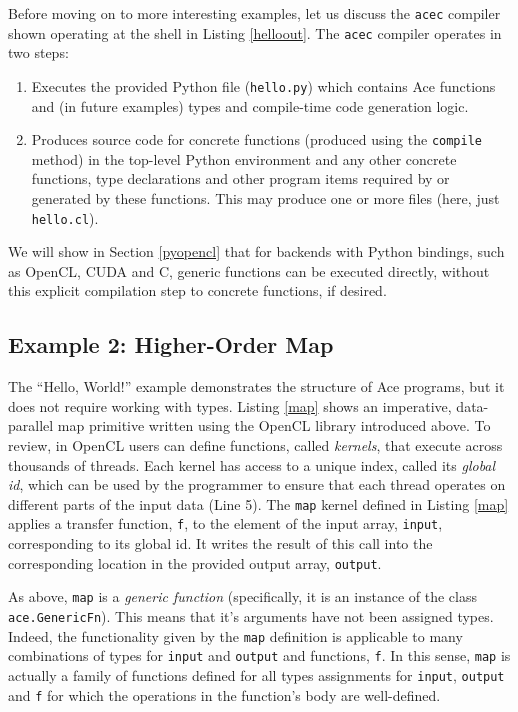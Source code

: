 \documentclass{sig-alternate}
\begin{document}
Before moving on to more interesting examples, let us discuss the \verb|acec| compiler shown operating at the shell in Listing \ref{helloout}. The \verb|acec| compiler operates in two steps:
\begin{enumerate}
\item Executes the provided Python file (\verb|hello.py|) which contains Ace functions and (in future examples) types and compile-time code generation logic.
\item Produces source code for concrete functions (produced using the \verb|compile| method) in the top-level Python environment and any other concrete functions, type declarations and other program items required by or generated by these functions. This may produce one or more files (here, just \verb|hello.cl|).
\end{enumerate}

We will show in Section \ref{pyopencl} that for backends with Python bindings, such as OpenCL, CUDA and C, generic functions can be executed directly, without this explicit compilation step to concrete functions, if desired.

\subsection{Example 2: Higher-Order Map}
The ``Hello, World!'' example demonstrates the structure of Ace programs, but it does not require working with types. Listing \ref{map} shows an imperative, data-parallel map primitive written using the OpenCL library introduced above. To review, in OpenCL users can define functions, called {\em kernels}, that execute across thousands of threads. Each kernel has access to a unique index, called its {\em global id}, which can be used by the programmer to ensure that each thread operates on different parts of the input data (Line 5). The \verb|map| kernel defined in Listing \ref{map} applies a transfer function, \verb|f|, to the element of the input array, \verb|input|, corresponding to its global id. It writes the result of this call into the corresponding location in the provided output array, \verb|output|.

As above, \verb|map| is a {\em generic function} (specifically, it is an instance of the class \verb|ace.GenericFn|). This means that it's arguments have not been assigned types. Indeed, the functionality given by the \verb|map| definition is applicable to many combinations of types for \verb|input| and \verb|output| and functions, \verb|f|. In this sense, \verb|map| is actually a family of functions defined for all types assignments for \verb|input|, \verb|output| and \verb|f| for which the operations in the function's body are well-defined.
\end{document}
